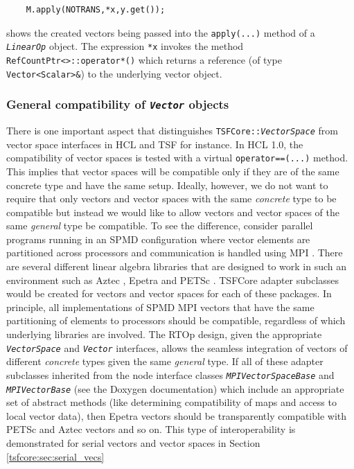 {\scriptsize\begin{verbatim}
    M.apply(NOTRANS,*x,y.get());
\end{verbatim}}

\noindent shows the created vectors being passed into the \texttt{apply(\-...)}
method of a \texttt{\textit{LinearOp}} object.  The expression
\texttt{*x} invokes the method
\texttt{RefCountPtr<>\-::operator*()} which returns a reference
(of type \texttt{Vector<Scalar>\&}) to the underlying vector object.

%
\subsubsection{General compatibility of \texttt{\textit{Vector}} objects}
\label{tsfcore:sec:vec_spc_compatibility}
%

There is one important aspect that distinguishes
\texttt{TSFCore\-::\textit{VectorSpace}} from vector space interfaces in
HCL and TSF for instance.  In HCL 1.0, the compatibility of vector
spaces is tested with a virtual \texttt{operator==(...)}  method.
This implies that vector spaces will be compatible only if they are of
the same concrete type and have the same setup.  Ideally, however, we
do not want to require that only vectors and vector spaces with the
same {\em concrete} type to be compatible but instead we would like to
allow vectors and vector spaces of the same {\em general} type be
compatible.  To see the difference, consider parallel programs running
in an SPMD configuration where vector elements are partitioned across
processors and communication is handled using MPI
\cite{ref:mpi}.  There are several different linear algebra libraries
that are designed to work in such an environment such as Aztec
\cite{sd:aztec}, Epetra \cite{ref:Epetra} and PETSc \cite{ref:petsc}.  TSFCore
adapter subclasses would be created for vectors and vector spaces for
each of these packages.  In principle, all implementations of SPMD MPI
vectors that have the same partitioning of elements to processors
should be compatible, regardless of which underlying libraries
are involved.  The RTOp design, given the appropriate
\texttt{\textit{VectorSpace}} and \texttt{\textit{Vector}} interfaces,
allows the seamless integration of vectors of different {\em concrete}
types given the same {\em general} type.  If all of these adapter
subclasses inherited from the node interface classes
\texttt{\textit{MPIVectorSpaceBase}} and
\texttt{\textit{MPIVectorBase}} (see the Doxygen documentation) which
include an appropriate set of abstract methods (like determining
compatibility of maps and access to local vector data), then Epetra
vectors should be transparently compatible with PETSc and Aztec
vectors and so on.  This type of interoperability is demonstrated for
serial vectors and vector spaces in Section
\ref{tsfcore:sec:serial_vecs}


